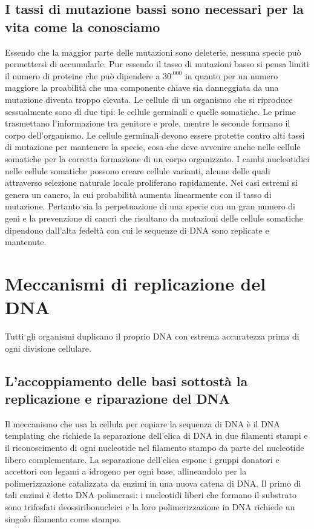 \subsection{I tassi di mutazione bassi sono necessari per la vita come la conosciamo}
Essendo che la maggior parte delle mutazioni sono deleterie, nessuna specie pu\`o permettersi di accumularle. Pur essendo il tasso di mutazioni basso si pensa limiti il numero di 
proteine che pu\`o dipendere a $30^.000$ in quanto per un numero maggiore la proabilit\`a che una componente chiave sia danneggiata da una mutazione diventa troppo elevata. Le cellule di
un organismo che si riproduce sessualmente sono di due tipi: le cellule germinali e quelle somatiche. Le prime trasmettano l'informazione tra genitore e prole, mentre le seconde formano
il corpo dell'organismo. Le cellule germinali devono essere protette contro alti tassi di mutazione per mantenere la specie, cosa che deve avvenire anche nelle cellule somatiche per 
la corretta formazione di un corpo organizzato. I cambi nucleotidici nelle cellule somatiche possono creare cellule varianti, alcune delle quali attraverso selezione naturale locale
proliferano rapidamente. Nei casi estremi si genera un cancro, la cui probabilit\`a aumenta linearmente con il tasso di mutazione. Pertanto sia la perpetuazione di una specie con un 
gran numero di geni e la prevenzione di cancri che risultano da mutazioni delle cellule somatiche dipendono dall'alta fedelt\`a con cui le sequenze di DNA sono replicate e mantenute. 
\section{Meccanismi di replicazione del DNA}
Tutti gli organismi duplicano il proprio DNA con estrema accuratezza prima di ogni divisione cellulare.
\subsection{L'accoppiamento delle basi sottost\`a la replicazione e riparazione del DNA}
Il meccanismo che usa la cellula per copiare la sequenza di DNA \`e il DNA templating che richiede la separazione dell'elica di DNA in due filamenti stampi e il riconoscimento di ogni
nucleotide nel filamento stampo da parte del nucleotide libero complementare. La separazione dell'elica espone i gruppi donatori e accettori con legami a idrogeno per ogni base, 
allineandolo per la polimerizzazione catalizzata da enzimi in una nuova catena di DNA. Il primo di tali enzimi \`e detto DNA polimerasi: i nucleotidi liberi che formano il substrato 
sono trifosfati deossiribonucleici e la loro polimerizzazione in DNA richiede un singolo filamento come stampo. 
